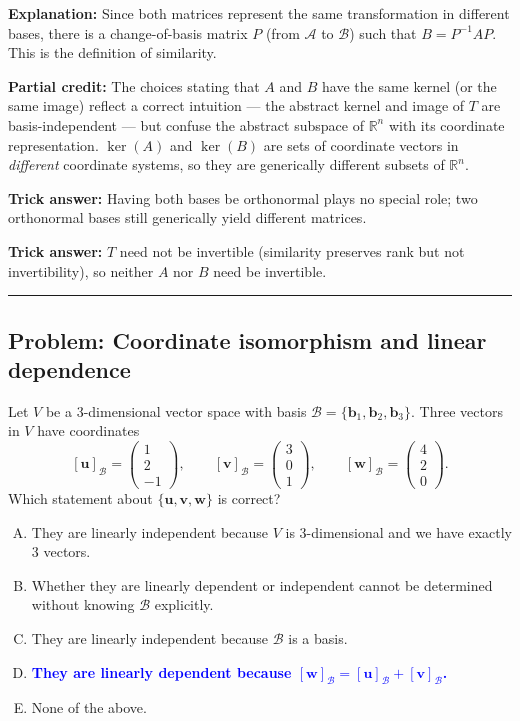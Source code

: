 \documentclass[12pt]{amsart}
\newcommand{\divider}{
  \vspace{-1em}
  \noindent
  \raisebox{-0.15ex}{\textbullet}%
  \hspace{0.5em}%
  \rule[0.5ex]{0.95\textwidth}{1.0pt}%
  \hspace{0.5em}%
  \raisebox{-0.15ex}{\textbullet}%
  \vspace{0em}
}
\begin{document}
\textbf{Explanation:}
Since both matrices represent the same transformation in different bases,
there is a change-of-basis matrix $P$ (from $\mathcal{A}$ to $\mathcal{B}$) such that
$B = P^{-1}AP$.
This is the definition of similarity.

\textbf{Partial credit:}
The choices stating that $A$ and $B$ have the same kernel (or the same image)
reflect a correct intuition --- the abstract kernel and image of $T$ are
basis-independent --- but confuse the abstract subspace of $\mathbb{R}^n$ with its
coordinate representation.
$\ker(A)$ and $\ker(B)$ are sets of coordinate vectors in \emph{different}
coordinate systems, so they are generically different subsets of $\mathbb{R}^n$.

\textbf{Trick answer:}
Having both bases be orthonormal plays no special role; two orthonormal bases
still generically yield different matrices.

\textbf{Trick answer:}
$T$ need not be invertible (similarity preserves rank but not invertibility),
so neither $A$ nor $B$ need be invertible.

\divider

\subsection*{Problem: Coordinate isomorphism and linear dependence}

Let $V$ be a 3-dimensional vector space with basis
$\mathcal{B} = \{\mathbf{b}_1, \mathbf{b}_2, \mathbf{b}_3\}$.
Three vectors in $V$ have coordinates
$$[\mathbf{u}]_\mathcal{B} = \begin{pmatrix} 1 \\ 2 \\ -1 \end{pmatrix}, \qquad
  [\mathbf{v}]_\mathcal{B} = \begin{pmatrix} 3 \\ 0 \\ 1 \end{pmatrix}, \qquad
  [\mathbf{w}]_\mathcal{B} = \begin{pmatrix} 4 \\ 2 \\ 0 \end{pmatrix}.$$
Which statement about $\{\mathbf{u},\mathbf{v},\mathbf{w}\}$ is correct?

\begin{enumerate}[(A)]
\item They are linearly independent because $V$ is 3-dimensional and we have exactly 3 vectors.
\item Whether they are linearly dependent or independent cannot be determined without knowing $\mathcal{B}$ explicitly.
\item They are linearly independent because $\mathcal{B}$ is a basis.
\item \textcolor{blue}{\textbf{They are linearly dependent because $[\mathbf{w}]_\mathcal{B} = [\mathbf{u}]_\mathcal{B} + [\mathbf{v}]_\mathcal{B}$.}}
\item None of the above.
\end{enumerate}
\end{document}
